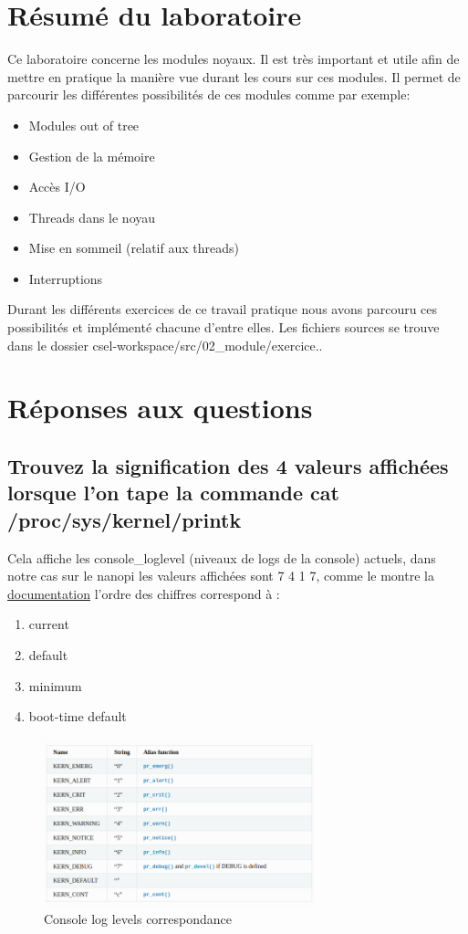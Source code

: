 \documentclass{ReportTemplate}
\begin{document}
\section{Résumé du laboratoire}
Ce laboratoire concerne les modules noyaux. Il est très important et utile afin
de mettre en pratique la manière vue durant les cours sur ces modules. Il permet
de parcourir les différentes possibilités de ces modules comme par exemple:
\begin{itemize}
    \item Modules out of tree
    \item Gestion de la mémoire
    \item Accès I/O
    \item Threads dans le noyau
    \item Mise en sommeil (relatif aux threads)
    \item Interruptions
\end{itemize}
Durant les différents exercices de ce travail pratique nous avons parcouru ces
possibilités et implémenté chacune d'entre elles. Les fichiers sources se trouve
dans le dossier csel-workspace/src/02\_module/exercice..\newline

\section{Réponses aux questions}
\subsection{Trouvez la signification des 4 valeurs affichées lorsque l’on tape la commande cat /proc/sys/kernel/printk}
\label{sec:signification}
Cela affiche les console\_loglevel (niveaux de logs de la console) actuels, dans
notre cas sur le nanopi les valeurs affichées sont 7 4 1 7, comme le montre la
\href{https://www.kernel.org/doc/html/latest/core-api/printk-basics.html}{documentation}
l'ordre des chiffres correspond à : 
\begin{enumerate}
    \item current
    \item default
    \item minimum
    \item boot-time default
\end{enumerate}

\begin{figure}[H]
    \centering
    \includegraphics[width=0.7\textwidth]{imageSources/console_loglevels.png}
    \caption{Console log levels correspondance}
    \label{fig:LogLevels}
\end{figure}
\end{document}
